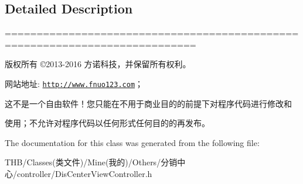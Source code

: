 \subsection{Detailed Description}
============================================================================

版权所有 ©2013-\/2016 方诺科技，并保留所有权利。

网站地址\+: \href{http://www.fnuo123.com}{\tt http\+://www.\+fnuo123.\+com}； 



这不是一个自由软件！您只能在不用于商业目的的前提下对程序代码进行修改和

使用；不允许对程序代码以任何形式任何目的的再发布。 

 

The documentation for this class was generated from the following file\+:\begin{DoxyCompactItemize}
\item 
T\+H\+B/\+Classes(类文件)/\+Mine(我的)/\+Others/分销中心/controller/Dis\+Center\+View\+Controller.\+h\end{DoxyCompactItemize}
